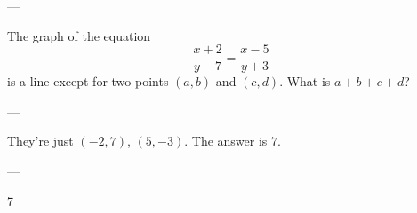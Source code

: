 
---

The graph of the equation\[\frac{x+2}{y-7}=\frac{x-5}{y+3}\]is a line except for two points $(a,b)$ and $(c,d)$. What is $a+b+c+d$?

---

They're just $(-2,7)$, $(5,-3)$. The answer is $7$.

---

7

